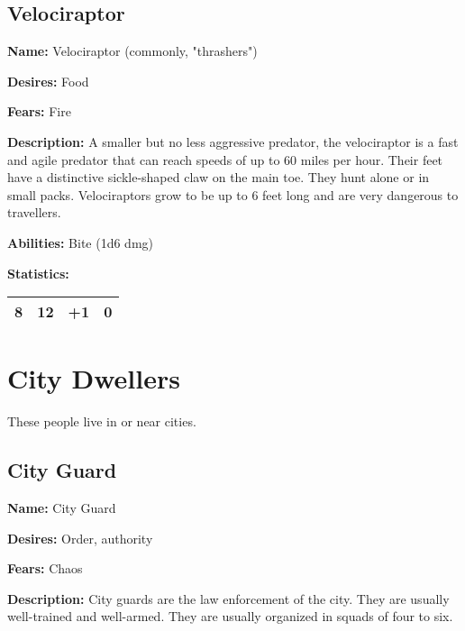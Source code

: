 \begin{multicols}{2}
\subsection{Velociraptor}

\textbf{Name:} Velociraptor (commonly, "thrashers") 

\textbf{Desires:} Food

\textbf{Fears:} Fire

\textbf{Description:} A smaller but no less aggressive predator, the velociraptor
is a fast and agile predator that can reach speeds of up to 60 miles per hour. Their
feet have a distinctive sickle-shaped claw on the main toe. They hunt alone or in small packs.
Velociraptors grow to be up to 6 feet long and are very dangerous to travellers.

\textbf{Abilities:} Bite (1d6 dmg)

\textbf{Statistics:}

\begin{center}
{
\begin{xtabular}{|l|l|l|l|}
8 & 12 & +1 & 0 \\
\hline
\end{xtabular}
}
\end{center}

\section{City Dwellers}

These people live in or near cities.

\subsection{City Guard}

\textbf{Name:} City Guard

\textbf{Desires:} Order, authority

\textbf{Fears:} Chaos

\textbf{Description:} City guards are the law enforcement of the city. They are usually
well-trained and well-armed. They are usually organized in squads of four to six.


\end{multicols}

